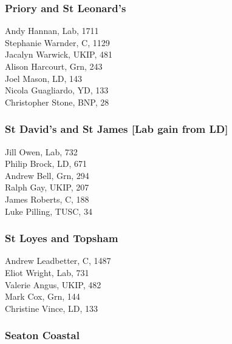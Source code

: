 \documentclass[a4paper,openany,10pt]{book}
\begin{document}
\subsubsection*{Priory and St Leonard's}



Andy Hannan, Lab, 1711\\
Stephanie Warnder, C, 1129\\
Jacalyn Warwick, UKIP, 481\\
Alison Harcourt, Grn, 243\\
Joel Mason, LD, 143\\
Nicola Guagliardo, YD, 133\\
Christopher Stone, BNP, 28\\


\subsubsection*{St David's and St James \hspace*{\fill}\nolinebreak[1]%
\enspace\hspace*{\fill}
[Lab gain from LD]}



Jill Owen, Lab, 732\\
Philip Brock, LD, 671\\
Andrew Bell, Grn, 294\\
Ralph Gay, UKIP, 207\\
James Roberts, C, 188\\
Luke Pilling, TUSC, 34\\


\subsubsection*{St Loyes and Topsham}



Andrew Leadbetter, C, 1487\\
Eliot Wright, Lab, 731\\
Valerie Angus, UKIP, 482\\
Mark Cox, Grn, 144\\
Christine Vince, LD, 133\\


\subsubsection*{Seaton Coastal}
\end{document}
